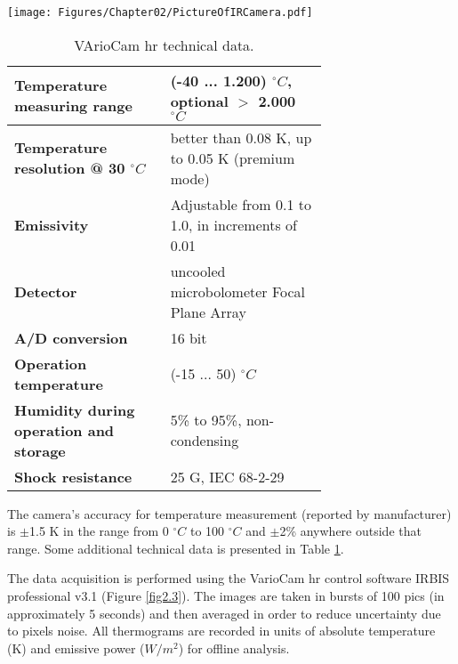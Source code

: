 		\begin{table}[ht!]
    		\begin{minipage}[b]{0.4\linewidth}
  				\centering
  				\captionsetup{justification=centering, margin=0.5cm}
  				\texttt{[image: Figures/Chapter02/PictureOfIRCamera.pdf]}
  				\label{fig2.2}
    		\end{minipage}
    		\begin{minipage}[b]{0.7\linewidth}
    			\centering
  				\captionsetup{justification=raggedright}
        		\caption{VArioCam hr technical data.}\label{tab2.1}
				\begin{tabular}{p{0.35\linewidth}p{0.35\linewidth}}\hline
					\textbf{Temperature measuring range} & (-40 ... 1.200) $^{\circ}C$, optional $>$ 2.000 $^{\circ}C$ \\ \hline 
					\textbf{Temperature resolution @ 30 $^{\circ}C$} &  better than 0.08 K, up to 0.05 K (premium mode) \\ \hline
					\textbf{Emissivity} & Adjustable from 0.1 to 1.0, in increments of 0.01 \\ \hline
					\textbf{Detector} &  uncooled microbolometer Focal Plane Array \\ \hline
					\textbf{A/D conversion} &  16 bit \\ \hline 
					\textbf{Operation temperature} & (-15 ... 50) $^{\circ}C$ \\ \hline
					\textbf{Humidity during operation and storage} & 5\% to 95\%, non-condensing \\ \hline
					\textbf{Shock resistance} & 25 G, IEC 68-2-29 \\ \hline
				\end{tabular}
    		\end{minipage}
		\end{table}
		
		The camera's accuracy for temperature measurement (reported by manufacturer) is $\pm$1.5 K in the range from 0 $^{\circ}C$ to 100 $^{\circ}C$ and $\pm$2\% anywhere outside that range. Some additional technical data is presented in Table \ref{tab2.1}.
		
		The data acquisition is performed using the VarioCam hr control software IRBIS \textregistered\space professional v3.1 (Figure \ref{fig2.3}). The images are taken in bursts of 100 pics (in approximately 5 seconds) and then averaged in order to reduce uncertainty due to pixels noise. All thermograms are recorded in units of absolute temperature (K) and emissive power ($W/m^2$) for offline analysis.
		
